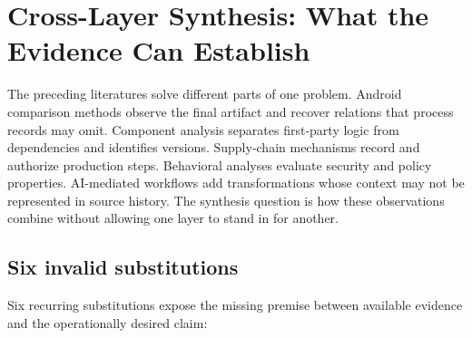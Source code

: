 \section{Cross-Layer Synthesis: What the Evidence Can Establish}
\label{sec:synthesis}

The preceding literatures solve different parts of one problem. Android comparison methods observe the final artifact and recover relations that process records may omit. Component analysis separates first-party logic from dependencies and identifies versions. Supply-chain mechanisms record and authorize production steps. Behavioral analyses evaluate security and policy properties. AI-mediated workflows add transformations whose context may not be represented in source history. The synthesis question is how these observations combine without allowing one layer to stand in for another.

\subsection{Six invalid substitutions}

Six recurring substitutions expose the missing premise between available evidence and the operationally desired claim:

